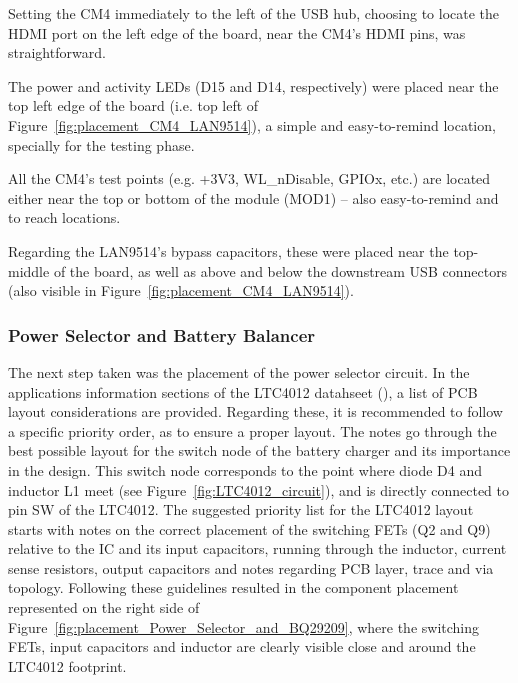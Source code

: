 Setting the CM4 immediately to the left of the USB hub, choosing to locate the HDMI port on the left edge of the board, near the CM4's HDMI pins, was straightforward.

The power and activity LEDs (D15 and D14, respectively) were placed near the top left edge of the board (i.e. top left of Figure~\ref{fig:placement_CM4_LAN9514}), a simple and easy-to-remind location, specially for the testing phase.

All the CM4's test points (e.g. +3V3, WL\_nDisable, GPIOx, etc.) are located either near the top or bottom of the module (MOD1) -- also easy-to-remind and to reach locations.

Regarding the LAN9514's bypass capacitors, these were placed near the top-middle of the board, as well as above and below the downstream USB connectors (also visible in Figure~\ref{fig:placement_CM4_LAN9514}).


\subsubsection{Power Selector and Battery Balancer}\label{sec:5112_LTC4012_BQ29209}

The next step taken was the placement of the power selector circuit. In the applications information sections of the LTC4012 datahseet (\cite{LTC4012}), a list of PCB layout considerations are provided. Regarding these, it is recommended to follow a specific priority order, as to ensure a proper layout. The notes go through the best possible layout for the switch node of the battery charger and its importance in the design. This switch node corresponds to the point where diode D4 and inductor L1 meet (see Figure~\ref{fig:LTC4012_circuit}), and is directly connected to pin SW of the LTC4012. The suggested priority list for the LTC4012 layout starts with notes on the correct placement of the switching FETs (Q2 and Q9) relative to the IC and its input capacitors, running through the inductor, current sense resistors, output capacitors and notes regarding PCB layer, trace and via topology. Following these guidelines resulted in the component placement represented on the right side of Figure~\ref{fig:placement_Power_Selector_and_BQ29209}, where the switching FETs, input capacitors and inductor are clearly visible close and around the LTC4012 footprint.

